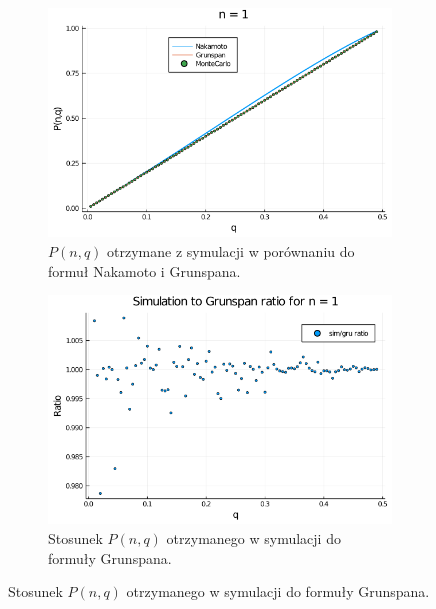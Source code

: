 \documentclass{article}
\begin{document}
        \begin{figure}[H]
            \centering
            \begin{subfigure}{0.65\textwidth}
                \includegraphics[width=\linewidth]{img/mc_n=1.png}
                \caption{$P(n,q)$ otrzymane z symulacji w porównaniu do formuł Nakamoto i Grunspana.}
            \end{subfigure}
    
            \begin{subfigure}{0.65\textwidth}
                \includegraphics[width=\linewidth]{img/mc_to_gr_n=1.png}
                \caption{Stosunek $P(n,q)$ otrzymanego w symulacji do formuły Grunspana.}
            \end{subfigure}
    

\end{figure}
\end{document}
